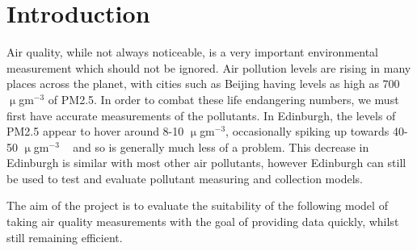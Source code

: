 \section{Introduction}\label{intro}


Air quality, while not always noticeable, is a very important environmental measurement which should not be ignored. Air pollution levels are rising in many places across the planet, with cities such as Beijing having levels as high as 700 $\upmu$gm$^{-3}$ of PM2.5. In order to combat these life endangering numbers, we must first have accurate measurements of the pollutants. In Edinburgh, the levels of PM2.5 appear to hover around 8-10 $\upmu$gm$^{-3}$, occasionally spiking up towards 40-50 $\upmu$gm$^{-3}$ ~\cite{pm2point5inscotland} and so is generally much less of a problem. This decrease in Edinburgh is similar with most other air pollutants, however Edinburgh can still be used to test and evaluate pollutant measuring and collection models. 

The aim of the project is to evaluate the suitability of the following model  of taking air quality measurements with the goal of providing data quickly, whilst still remaining efficient. 


